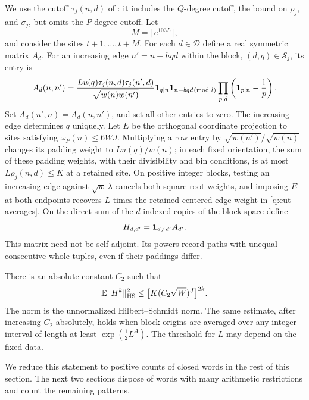 We use the cutoff $\tau_j(n,d)$ of : it includes the
$Q$-degree cutoff, the bound on $\rho_j$, and $\sigma_j$, but omits
the $P$-degree cutoff.  Let
\[
 M=\lceil e^{103L}\rceil,
\]
and consider the sites $t+1,\ldots,t+M$.  For each $d\in\mathcal D$
define a real symmetric matrix $A_d$.  For an increasing edge
$n'=n+hqd$ within the block, $(d,q)\in\mathcal S_j$, its entry is
\begin{equation}\label{q:matrix-entry}
 A_d(n,n')=
 \frac{Lu(q)\tau_j(n,d)\tau_j(n',d)}{\sqrt{w(n)w(n')}}
 \mathbf 1_{q\mid n}\mathbf 1_{n\equiv bqd\!\!\pmod l}
 \prod_{p\mid d}\left(\mathbf 1_{p\mid n}-\frac1p\right).
\end{equation}
Set $A_d(n',n)=A_d(n,n')$, and set all other entries to zero.
The increasing edge determines $q$ uniquely.  Let $E$ be the
orthogonal coordinate projection to sites satisfying
$\omega_P(n)\le6WJ$.
Multiplying a row entry by $\sqrt{w(n')}/\sqrt{w(n)}$ changes its
padding weight to $Lu(q)/w(n)$; in each fixed orientation, the sum of
these padding weights, with their divisibility and bin conditions,
is at most $L\rho_j(n,d)\le K$ at a retained site.
On positive integer blocks, testing an increasing edge against $\sqrt w\,\lambda$
cancels both square-root weights, and imposing $E$ at both endpoints
recovers $L$ times the retained centered edge weight in
\eqref{q:cut-averages}.
On the direct sum of the $d$-indexed copies
of the block space define
\[
 H_{d,d'}=\mathbf 1_{d\ne d'}A_{d'}.
\]
This matrix need not be self-adjoint.  Its powers record paths with
unequal consecutive whole tuples, even if their paddings differ.

\begin{theorem}\label{q:trace}
There is an absolute constant $C_2$ such that
\begin{equation}\label{q:trace-bound}
 \mathbb E\|H^k\|_{\mathrm{HS}}^2
 \le\bigl[K(C_2\sqrt W)^J\bigr]^{2k}.
\end{equation}
The norm is the unnormalized Hilbert--Schmidt norm.  The same estimate,
after increasing $C_2$ absolutely, holds when block origins are averaged
over any integer interval of length at least $\exp(\tfrac12L^A)$.
The threshold for $L$ may depend on the fixed data.
\end{theorem}

We reduce this statement to positive counts of closed words in the
rest of this section.  The next two sections dispose of words with
many arithmetic restrictions and count the remaining patterns.


